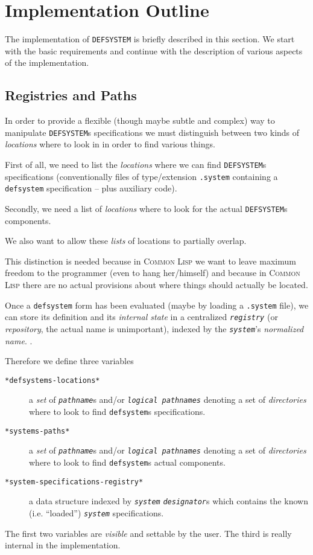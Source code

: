 \documentclass[a4paper]{article}
\newcommand{\CL}{\textsc{Common Lisp}}
\newcommand{\DEFSYSTEM}{\texttt{DEFSYSTEM}}
\newcommand{\marginnote}[1]{%
\marginpar{\begin{small}\begin{em}
\raggedright #1
\end{em}\end{small}}}
\newcommand{\code}[1]{\texttt{#1}}
\newcommand{\object}[1]{\texttt{\textit{#1}}} %
\newcommand{\clobject}[1]{\texttt{\textit{#1}}} %
\begin{document}
\section{Implementation Outline}

The implementation of \DEFSYSTEM{} is briefly described in this
section. We start with the basic requirements and continue with the
description of various aspects of the implementation.

\subsection{Registries and Paths}

In order to provide a flexible (though maybe subtle and complex) way
to manipulate \DEFSYSTEM{}s specifications we must distinguish between
two kinds of \emph{locations} where to look in in order to find
various things.

First of all, we need to list the \emph{locations} where we can find
\DEFSYSTEM{}s specifications (conventionally files of type/extension
\code{.system} containing a \code{defsystem} specification -- plus
auxiliary code).

Secondly, we need a list of \emph{locations} where to look for the actual
\DEFSYSTEM{}s components.

We also want to allow these \emph{lists} of locations to partially
overlap.

This distinction is needed because in \CL{} we want to leave maximum
freedom to the programmer (even to hang her/himself) and because in \CL{}
there are no actual provisions about where things should actually be
located.

Once a \code{defsystem} form has been evaluated (maybe by loading a
\code{.system} file), we can store its definition and its
\emph{internal state} in a centralized
\object{registry} (or \emph{repository}, the actual name is
unimportant), indexed by the \object{system}'s \emph{normalized name}.
\marginnote{Define ``normalized name''.}.

\noindent
Therefore we define three variables
\begin{description}
\item[\code{*defsystems-locations*}] a \emph{set} of
	\clobject{pathname}s and/or \clobject{logical pathnames}
	denoting a set of \emph{directories} where to look to find
	\code{defsystem}s specifications.

\item[\code{*systems-paths*}]  a \emph{set} of
	\clobject{pathname}s and/or \clobject{logical pathnames}
	denoting a set of \emph{directories} where to look to find
	\code{defsystem}s actual components.

\item[\code{*system-specifications-registry*}] a data structure
	indexed by \object{system} \object{designator}s which contains the
	known (i.e. ``loaded'') \object{system} specifications.
\end{description}
The first two variables are \emph{visible} and settable by the
user. The third is really internal in the implementation.
\end{document}
